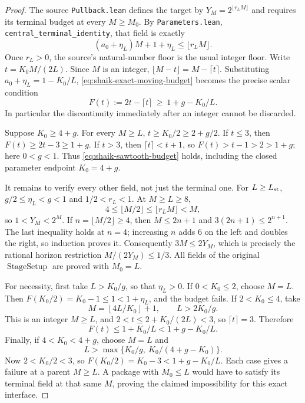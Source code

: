 \documentclass[11pt]{article}
\theoremstyle{remark}\newtheorem{remark}[proposition]{Remark}
\begin{document}
\begin{proof}
The source \texttt{Pullback.lean} defines the target by
\(Y_M=2^{\lfloor r_LM\rfloor}\) and requires its terminal budget
at every \(M\ge M_0\). By \texttt{Parameters.lean},
\texttt{central\_terminal\_identity}, that field is exactly
\begin{equation}\label{eq:shaik-exact-moving-budget}
 (a_0+\eta_L)M+1+\eta_L\le\lfloor r_LM\rfloor .
\end{equation}
Once \(r_L>0\), the source's natural-number floor is the usual
integer floor. Write \(t=K_0M/(2L)\). Since \(M\) is an integer,
\(\lfloor M-t\rfloor=M-\lceil t\rceil\). Substituting
\(a_0+\eta_L=1-K_0/L\), \eqref{eq:shaik-exact-moving-budget}
becomes the precise scalar condition
\begin{equation}\label{eq:shaik-sawtooth-budget}
 F(t):=2t-\lceil t\rceil\ \ge\ 1+g-K_0/L.
\end{equation}
In particular the discontinuity immediately after an integer
cannot be discarded.

Suppose \(K_0\ge4+g\). For every \(M\ge L\),
\(t\ge K_0/2\ge2+g/2\). If \(t\le3\), then
\(F(t)\ge2t-3\ge1+g\). If \(t>3\), then
\(\lceil t\rceil<t+1\), so \(F(t)>t-1>2>1+g\);
here \(0<g<1\). Thus \eqref{eq:shaik-sawtooth-budget}
holds, including the closed parameter endpoint \(K_0=4+g\).

It remains to verify every other field, not just the terminal one.
For \(L\ge L_{\rm st}\), \(g/2\le\eta_L<g<1\) and
\(1/2<r_L<1\). At \(M\ge L\ge8\),
\[
 4\le\lfloor M/2\rfloor\le\lfloor r_LM\rfloor<M,
\]
so \(1<Y_M<2^M\). If \(n=\lfloor M/2\rfloor\ge4\),
then \(M\le2n+1\) and \(3(2n+1)\le2^{n+1}\).
The last inequality holds at \(n=4\); increasing \(n\) adds \(6\)
on the left and doubles the right, so induction proves it.
Consequently \(3M\le2Y_M\), which is precisely the rational
horizon restriction \(M/(2Y_M)\le1/3\).
All fields of the original \(\operatorname{StageSetup}\) are proved
with \(M_0=L\).

For necessity, first take \(L>K_0/g\), so that \(\eta_L>0\).
If \(0<K_0\le2\), choose \(M=L\). Then
\(F(K_0/2)=K_0-1\le1<1+\eta_L\), and the budget fails.
If \(2<K_0\le4\), take
\[
 M=\left\lfloor4L/K_0\right\rfloor+1,\qquad L>2K_0/g.
\]
This is an integer \(M\ge L\), and
\(2<t\le2+K_0/(2L)<3\), so \(\lceil t\rceil=3\).
Therefore
\[
 F(t)\le1+K_0/L<1+g-K_0/L.
\]
Finally, if \(4<K_0<4+g\), choose \(M=L\) and
\[
 L>\max\{K_0/g,\ K_0/(4+g-K_0)\}.
\]
Now \(2<K_0/2<3\), so
\(F(K_0/2)=K_0-3<1+g-K_0/L\).
Each case gives a failure at a parent \(M\ge L\).
A package with \(M_0\le L\) would have to satisfy its terminal
field at that same \(M\), proving the claimed impossibility for
this exact interface.
\end{proof}
\end{document}

